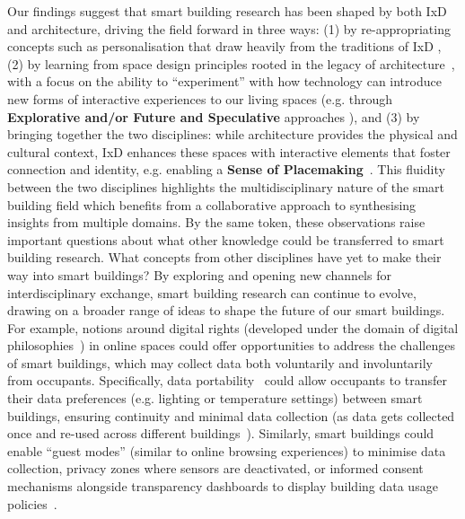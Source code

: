 Our findings suggest that smart building research has been shaped by both IxD and architecture, driving the field forward in three ways: (1) by re-appropriating concepts such as personalisation that draw heavily from the traditions of IxD \cite{lundgaard2019temporal}, (2) by learning from space design principles rooted in the legacy of architecture~\cite{hillier1976space}, with a focus on the ability to ``experiment'' with how technology can introduce new forms of interactive experiences to our living spaces (e.g. through \textbf{Explorative and/or Future and Speculative} approaches \cite{takeuchi2009bezier}), and (3) by bringing together the two disciplines: while architecture provides the physical and cultural context, IxD enhances these spaces with interactive elements that foster connection and identity, e.g. enabling a \textbf{Sense of Placemaking}~\cite{alfonso2024embodied}. This fluidity between the two disciplines highlights the multidisciplinary nature of the smart building field which benefits from a collaborative approach to synthesising insights from multiple domains. By the same token, these observations raise important questions about what other knowledge could be transferred to smart building research. What concepts from other disciplines have yet to make their way into smart buildings? By exploring and opening new channels for interdisciplinary exchange, smart building research can continue to evolve, drawing on a broader range of ideas to shape the future of our smart buildings. For example, notions around digital rights (developed under the domain of digital philosophies~\cite{leonelli2016philosophy}) in online spaces could offer opportunities to address the challenges of smart buildings, which may collect data both voluntarily and involuntarily from occupants. Specifically, data portability~\cite{leonelli2016philosophy} could allow occupants to transfer their data preferences (e.g. lighting or temperature settings) between smart buildings, ensuring continuity and minimal data collection (as data gets collected once and re-used across different buildings~\cite{turner2021exercisability}). Similarly, smart buildings could enable ``guest modes'' (similar to online browsing experiences) to minimise data collection, privacy zones where sensors are deactivated, or informed consent mechanisms alongside transparency dashboards to display building data usage policies~\cite{santucci2013privacy}.



